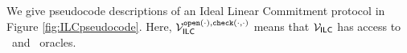 

We give pseudocode descriptions of an Ideal Linear Commitment protocol in Figure \ref{fig:ILCpseudocode}. Here, $\mathcal{V}_{\mathsf{ILC}}^{\texttt{open}(\cdot),\texttt{check}(\cdot,\cdot)}$ means that $\mathcal{V}_{\mathsf{ILC}}$ has access to \ILCopen\ and \ILCcheck\ oracles.

